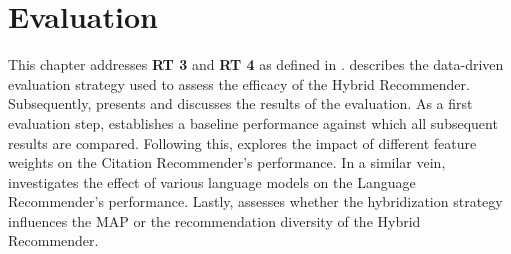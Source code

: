 \chapter{Evaluation} \label{sec:evaluation}

This chapter addresses \textbf{\ac{RT} 3} and \textbf{\ac{RT} 4} as defined in .
 describes the data-driven evaluation strategy used to assess the efficacy of the Hybrid Recommender. Subsequently,  presents and discusses the results of the evaluation.
As a first evaluation step,  establishes a baseline performance against which all subsequent results are compared.
Following this,  explores the impact of different feature weights on the Citation Recommender's performance.
In a similar vein,  investigates the effect of various language models on the Language Recommender's performance.
Lastly,  assesses whether the hybridization strategy influences the \ac{MAP} or the recommendation diversity of the Hybrid Recommender.
